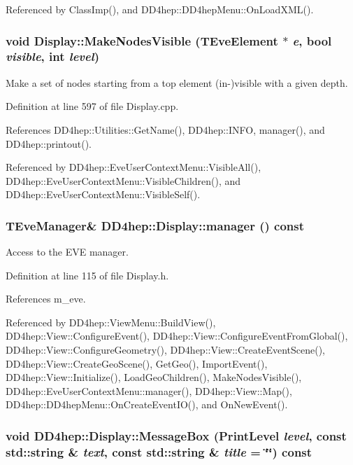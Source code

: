 Referenced by ClassImp(), and DD4hep::DD4hepMenu::OnLoadXML().\hypertarget{class_d_d4hep_1_1_display_a7d6adb53b1895ebb1133b4e5bbb1d6d4}{
\subsubsection[{MakeNodesVisible}]{\setlength{\rightskip}{0pt plus 5cm}void Display::MakeNodesVisible (TEveElement $\ast$ {\em e}, \/  bool {\em visible}, \/  int {\em level})}}
\label{class_d_d4hep_1_1_display_a7d6adb53b1895ebb1133b4e5bbb1d6d4}


Make a set of nodes starting from a top element (in-\/)visible with a given depth. 

Definition at line 597 of file Display.cpp.

References DD4hep::Utilities::GetName(), DD4hep::INFO, manager(), and DD4hep::printout().

Referenced by DD4hep::EveUserContextMenu::VisibleAll(), DD4hep::EveUserContextMenu::VisibleChildren(), and DD4hep::EveUserContextMenu::VisibleSelf().\hypertarget{class_d_d4hep_1_1_display_a90c0d17c6cc028ebaffa729e30f20ed6}{
\subsubsection[{manager}]{\setlength{\rightskip}{0pt plus 5cm}TEveManager\& DD4hep::Display::manager () const}}
\label{class_d_d4hep_1_1_display_a90c0d17c6cc028ebaffa729e30f20ed6}


Access to the EVE manager. 

Definition at line 115 of file Display.h.

References m\_\-eve.

Referenced by DD4hep::ViewMenu::BuildView(), DD4hep::View::ConfigureEvent(), DD4hep::View::ConfigureEventFromGlobal(), DD4hep::View::ConfigureGeometry(), DD4hep::View::CreateEventScene(), DD4hep::View::CreateGeoScene(), GetGeo(), ImportEvent(), DD4hep::View::Initialize(), LoadGeoChildren(), MakeNodesVisible(), DD4hep::EveUserContextMenu::manager(), DD4hep::View::Map(), DD4hep::DD4hepMenu::OnCreateEventIO(), and OnNewEvent().\hypertarget{class_d_d4hep_1_1_display_ad4ed1bcbf85919e1ae80d597329a42e1}{
\subsubsection[{MessageBox}]{\setlength{\rightskip}{0pt plus 5cm}void DD4hep::Display::MessageBox ({\bf PrintLevel} {\em level}, \/  const std::string \& {\em text}, \/  const std::string \& {\em title} = {\ttfamily \char`\"{}\char`\"{}}) const}}
\label{class_d_d4hep_1_1_display_ad4ed1bcbf85919e1ae80d597329a42e1}


